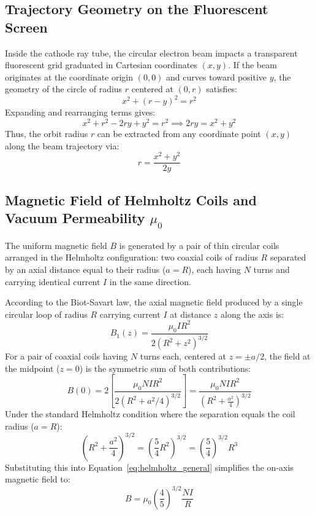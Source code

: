\documentclass[journal]{IEEEtran}
\begin{document}
\subsection{Trajectory Geometry on the Fluorescent Screen}
Inside the cathode ray tube, the circular electron beam impacts a transparent fluorescent grid graduated in Cartesian coordinates $(x, y)$. If the beam originates at the coordinate origin $(0, 0)$ and curves toward positive $y$, the geometry of the circle of radius $r$ centered at $(0, r)$ satisfies:
\begin{equation}
    x^2 + (r - y)^2 = r^2
\end{equation}
Expanding and rearranging terms gives:
\begin{equation}
    x^2 + r^2 - 2 r y + y^2 = r^2 \implies 2 r y = x^2 + y^2
\end{equation}
Thus, the orbit radius $r$ can be extracted from any coordinate point $(x, y)$ along the beam trajectory via:
\begin{equation}
    r = \frac{x^2 + y^2}{2y}
    \label{eq:radius_calc}
\end{equation}

\subsection{Magnetic Field of Helmholtz Coils and Vacuum Permeability \texorpdfstring{$\mu_0$}{mu0}}
The uniform magnetic field $B$ is generated by a pair of thin circular coils arranged in the Helmholtz configuration: two coaxial coils of radius $R$ separated by an axial distance equal to their radius ($a = R$), each having $N$ turns and carrying identical current $I$ in the same direction.

According to the Biot-Savart law, the axial magnetic field produced by a single circular loop of radius $R$ carrying current $I$ at distance $z$ along the axis is:
\begin{equation}
    B_1(z) = \frac{\mu_0 I R^2}{2 (R^2 + z^2)^{3/2}}
\end{equation}
For a pair of coaxial coils having $N$ turns each, centered at $z = \pm a/2$, the field at the midpoint ($z = 0$) is the symmetric sum of both contributions:
\begin{equation}
    B(0) = 2 \left[ \frac{\mu_0 N I R^2}{2 (R^2 + a^2/4)^{3/2}} \right] = \frac{\mu_0 N I R^2}{\left(R^2 + \frac{a^2}{4}\right)^{3/2}}
    \label{eq:helmholtz_general}
\end{equation}
Under the standard Helmholtz condition where the separation equals the coil radius ($a = R$):
\begin{equation}
    \left(R^2 + \frac{a^2}{4}\right)^{3/2} = \left(\frac{5}{4} R^2\right)^{3/2} = \left(\frac{5}{4}\right)^{3/2} R^3
\end{equation}
Substituting this into Equation~\eqref{eq:helmholtz_general} simplifies the on-axis magnetic field to:
\begin{equation}
    B = \mu_0 \left(\frac{4}{5}\right)^{3/2} \frac{N I}{R}
    \label{eq:helmholtz_si}
\end{equation}
\end{document}
